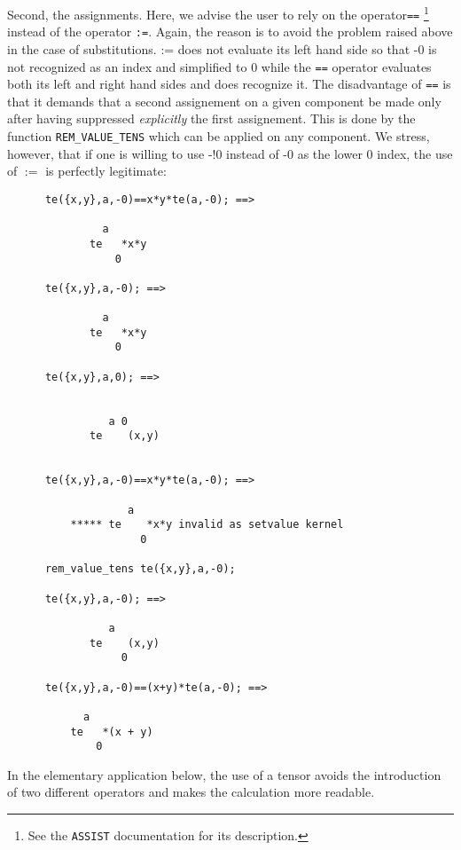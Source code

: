 Second, the assignments. Here, we advise the user to rely on  the
operator\texttt{==}%
%
\footnote{See the \texttt{ASSIST} documentation for its description.}
instead of the operator \texttt{:=}. Again,
the reason is to avoid the problem raised above  in the case of
substitutions. {:=} does not evaluate its left hand side so that -0 is
not recognized as an index and simplified to 0 while the \texttt{==} operator
evaluates both
its left and right hand sides and does recognize it.
The disadvantage of \texttt{==} is that it  demands that a second assignement
on a given component
 be made only after having suppressed \emph{explicitly} the first assignement.
This is done by the function \texttt{REM\_VALUE\_TENS}
which can be applied on any component. We stress, however, that if one
is willing to use -!0 instead of -0 as the lower 0 index, the use of $:=$
is perfectly legitimate:
\begin{verbatim}
      te({x,y},a,-0)==x*y*te(a,-0); ==>

               a
             te   *x*y
                 0

      te({x,y},a,-0); ==>

               a
             te   *x*y
                 0

      te({x,y},a,0); ==>


                a 0
             te    (x,y)


      te({x,y},a,-0)==x*y*te(a,-0); ==>

                   a
          ***** te    *x*y invalid as setvalue kernel
                     0

      rem_value_tens te({x,y},a,-0);

      te({x,y},a,-0); ==>

                a
             te    (x,y)
                  0

      te({x,y},a,-0)==(x+y)*te(a,-0); ==>

            a
          te   *(x + y)
              0
\end{verbatim}
In the elementary application below, the use of a tensor avoids the
introduction of two different operators and  makes the
calculation  more readable.
